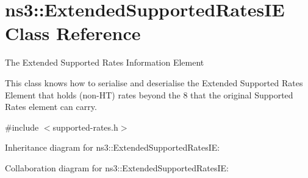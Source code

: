 \hypertarget{classns3_1_1ExtendedSupportedRatesIE}{}\section{ns3\+:\+:Extended\+Supported\+Rates\+IE Class Reference}
\label{classns3_1_1ExtendedSupportedRatesIE}


The Extended Supported Rates Information Element

This class knows how to serialise and deserialise the Extended Supported Rates Element that holds (non-\/\+HT) rates beyond the 8 that the original Supported Rates element can carry.  




{\ttfamily \#include $<$supported-\/rates.\+h$>$}



Inheritance diagram for ns3\+:\+:Extended\+Supported\+Rates\+IE\+:


Collaboration diagram for ns3\+:\+:Extended\+Supported\+Rates\+IE\+:
